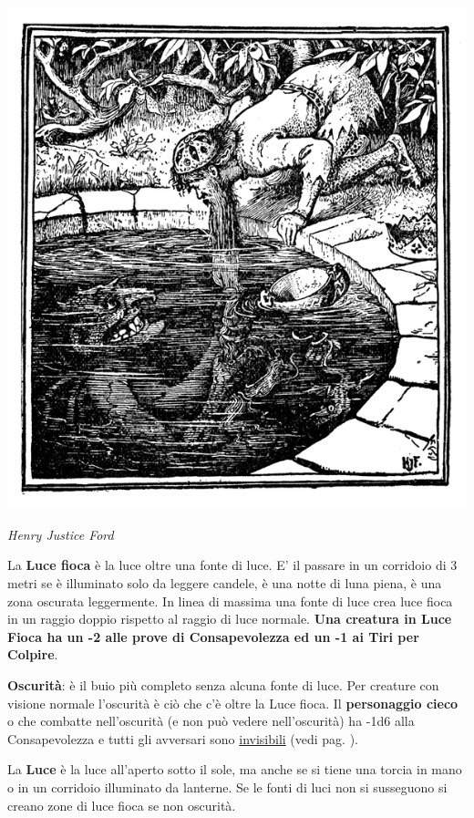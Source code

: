 \begin{multicols}{2}
\begin{center}
\includegraphics[width=0.8\linewidth]{immagini/oscurita.png}

\emph{Henry Justice Ford}
\end{center}

\medskip

La \textbf{Luce fioca} è la luce oltre una fonte di luce. E' il passare in un corridoio di 3 metri se è illuminato solo da leggere candele, è una notte di luna piena, è una zona oscurata leggermente.
In linea di massima una fonte di luce crea luce fioca in un raggio doppio rispetto al raggio di luce normale. \textbf{Una creatura in Luce Fioca ha un -2 alle prove di Consapevolezza ed un -1 ai Tiri per Colpire}.

\medskip

\textbf{Oscurità}: è il buio più completo senza alcuna fonte di luce. Per creature con visione normale l'oscurità è ciò che c'è oltre la Luce fioca.
Il \textbf{personaggio cieco} o che combatte nell'oscurità (e non può vedere nell'oscurità) ha -1d6 alla Consapevolezza e tutti gli avversari sono \hyperlink{invisibilita}{invisibili} (vedi pag. \pageref{invisibilita}).

\medskip

La \textbf{Luce} è la luce all'aperto sotto il sole, ma anche se si tiene una torcia in mano o in un corridoio illuminato da lanterne. Se le fonti di luci non si susseguono si creano zone di luce fioca se non oscurità.


\end{multicols}
